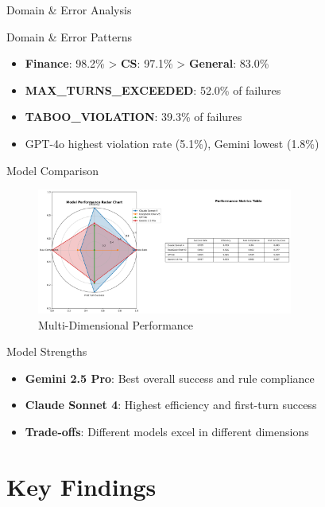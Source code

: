 \documentclass[aspectratio=169]{beamer}
\begin{document}
\begin{frame}{Domain \& Error Analysis}
\begin{block}{Domain \& Error Patterns}
\begin{itemize}
    \item \textbf{Finance}: 98.2\% > \textbf{CS}: 97.1\% > \textbf{General}: 83.0\%
    \item \textbf{MAX\_TURNS\_EXCEEDED}: 52.0\% of failures
    \item \textbf{TABOO\_VIOLATION}: 39.3\% of failures
    \item GPT-4o highest violation rate (5.1\%), Gemini lowest (1.8\%)
\end{itemize}
\end{block}
\end{frame}

\begin{frame}{Model Comparison}
\begin{figure}[h]
\centering
\includegraphics[width=0.75\textwidth]{comprehensive_figures/figure7_radar.png}
\caption{Multi-Dimensional Performance}
\end{figure}

\begin{block}{Model Strengths}
\begin{itemize}
    \item \textbf{Gemini 2.5 Pro}: Best overall success and rule compliance
    \item \textbf{Claude Sonnet 4}: Highest efficiency and first-turn success
    \item \textbf{Trade-offs}: Different models excel in different dimensions
\end{itemize}
\end{block}
\end{frame}

\section{Key Findings}
\end{document}
